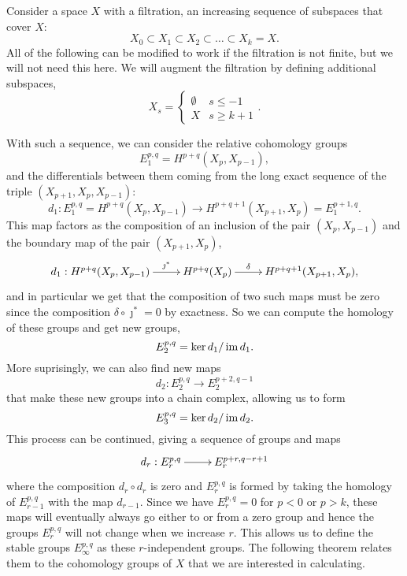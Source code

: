 Consider a space $X$ with a filtration, an increasing sequence
of subspaces that cover $X$:
\[ X_0 \subset X_1 \subset X_2 \subset
\dots \subset X_k  = X. \]
All of the following can be modified to work if the filtration is not
finite, but we will not need this here. We will augment the filtration
by defining additional subspaces,
\[ X_s =
\begin{cases}
  \emptyset & s \leq -1 \\
  X & s \geq k+1
\end{cases}. \]

With such a sequence, we can
consider the relative cohomology groups
\[ E_1^{p,q} = H^{p+q}(X_p,X_{p-1}), \]
and the differentials between them coming from the long exact sequence
of the triple $(X_{p+1},X_p,X_{p-1})$:
\[ d_1 : E_1^{p,q} = H^{p+q}(X_p,X_{p-1}) \to H^{p+q+1}(X_{p+1},X_p) =
E_1^{p+1,q}. \]
This map factors as the composition of an
inclusion of the pair $(X_p,X_{p-1})$ and the boundary map of the pair
$(X_{p+1},X_p)$,
\[ \xymatrix{ d_1 : H^{p+q}(X_p,X_{p-1}) \ar[r]^<<<<<{\jmath^*} &
  H^{p+q}(X_p) \ar[r]^<<<<<{\delta} & H^{p+q+1}(X_{p+1},X_p),
} \]
and in particular we get that the composition of two such maps must be
zero since the composition $\delta \circ \jmath^* = 0$ by
exactness. So we can compute the homology of these groups and get new
groups,
\[ E_2^{p,q} = \ker d_1 / \operatorname{im} d_1. \]
More suprisingly, we can also find new maps
\[ d_2 : E_2^{p,q} \to E_2^{p+2,q-1} \]
that make these new groups into a chain complex, allowing us to form
\[ E_3^{p,q} = \ker d_2 / \operatorname{im} d_2. \]
This process can be continued, giving a sequence of groups and maps
\[ \xymatrix{d_r : E_r^{p,q} \ar[r] & E_r^{p+r,q-r+1} } \]
where the composition $d_r \circ d_r$ is zero and
$E_r^{p,q}$ is formed by taking the homology of $E_{r-1}^{p,q}$ with
the map $d_{r-1}$. Since we have $E_r^{p,q} = 0$ for $p < 0$ or $p >
k$, these maps will eventually always go either to or from a zero
group and hence the groups $E_r^{p,q}$ will not change when we
increase $r$. This allows us to
define the stable groups $E_\infty^{p,q}$ as these $r$-independent
groups. The following theorem relates them to the cohomology groups of
$X$ that we are interested in calculating.

